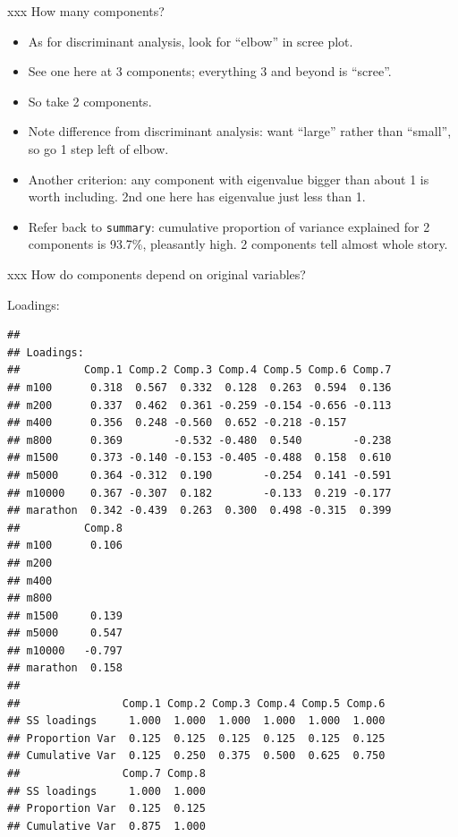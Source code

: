 \documentclass[ignorenonframetext,]{beamer}
\newenvironment{Shaded}{\begin{snugshade}}{\end{snugshade}}
\newcommand{\NormalTok}[1]{#1}
\newcommand{\OperatorTok}[1]{\textcolor[rgb]{0.81,0.36,0.00}{\textbf{#1}}}
\begin{document}
\begin{frame}[fragile]{xxx How many components?}
\protect\hypertarget{xxx-how-many-components}{}

\begin{itemize}
\item
  As for discriminant analysis, look for ``elbow'' in scree plot.
\item
  See one here at 3 components; everything 3 and beyond is ``scree''.
\item
  So take 2 components.
\item
  Note difference from discriminant analysis: want ``large'' rather than
  ``small'', so go 1 step left of elbow.
\item
  Another criterion: any component with eigenvalue bigger than about 1
  is worth including. 2nd one here has eigenvalue just less than 1.
\item
  Refer back to \texttt{summary}: cumulative proportion of variance
  explained for 2 components is 93.7\%, pleasantly high. 2 components
  tell almost whole story.
\end{itemize}

\end{frame}

\begin{frame}[fragile]{xxx How do components depend on original
variables?}
\protect\hypertarget{xxx-how-do-components-depend-on-original-variables}{}

Loadings:

\begin{Shaded}
\end{Shaded}

\begin{verbatim}
## 
## Loadings:
##          Comp.1 Comp.2 Comp.3 Comp.4 Comp.5 Comp.6 Comp.7
## m100      0.318  0.567  0.332  0.128  0.263  0.594  0.136
## m200      0.337  0.462  0.361 -0.259 -0.154 -0.656 -0.113
## m400      0.356  0.248 -0.560  0.652 -0.218 -0.157       
## m800      0.369        -0.532 -0.480  0.540        -0.238
## m1500     0.373 -0.140 -0.153 -0.405 -0.488  0.158  0.610
## m5000     0.364 -0.312  0.190        -0.254  0.141 -0.591
## m10000    0.367 -0.307  0.182        -0.133  0.219 -0.177
## marathon  0.342 -0.439  0.263  0.300  0.498 -0.315  0.399
##          Comp.8
## m100      0.106
## m200           
## m400           
## m800           
## m1500     0.139
## m5000     0.547
## m10000   -0.797
## marathon  0.158
## 
##                Comp.1 Comp.2 Comp.3 Comp.4 Comp.5 Comp.6
## SS loadings     1.000  1.000  1.000  1.000  1.000  1.000
## Proportion Var  0.125  0.125  0.125  0.125  0.125  0.125
## Cumulative Var  0.125  0.250  0.375  0.500  0.625  0.750
##                Comp.7 Comp.8
## SS loadings     1.000  1.000
## Proportion Var  0.125  0.125
## Cumulative Var  0.875  1.000
\end{verbatim}

\end{frame}
\end{document}
